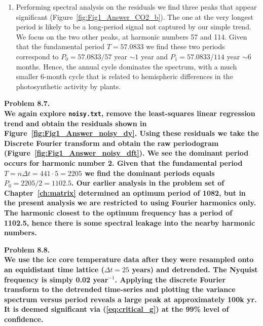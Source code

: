 \begin{enumerate}[label=\alph*)]
\item Performing spectral analysis on the residuals we find three peaks that appear significant
(Figure~\ref{fig:Fig1_Answer_CO2_b}).  The one at
the very longest period is likely to be a long-period signal not captured by our simple trend.  We focus on the two
other peaks, at harmonic numbers 57 and 114.  Given that the fundamental period $T = 57.0833$ we find these
two periods correspond to $P_0 = 57.0833/57$ year $\sim 1$ year and $P_1 = 57.0833/114$ year $\sim 6$ months.
Hence, the annual cycle dominates the spectrum, with a much smaller 6-month cycle that is related to hemispheric
differences in the photosynthetic activity by plants.
\end{enumerate}


\noindent
\bf{Problem 8.7.} \\

We again explore \texttt{noisy.txt}, remove the least-squares linear regression trend and obtain the residuals shown in Figure~\ref{fig:Fig1_Answer_noisy_dy}.
Using these residuals we take the Discrete Fourier transform and obtain the raw periodogram (Figure~\ref{fig:Fig1_Answer_noisy_dft}). We see the dominant period occurs for harmonic number 2.  Given that
the fundamental period $T = n\Delta t = 441 \cdot 5 = 2205$ we find the dominant
periods equals $P_0 = 2205/2 = 1102.5$.  Our earlier analysis in the problem set of Chapter~\ref{ch:matrix}
determined an optimum period of 1082, but in the
present analysis we are restricted to using Fourier harmonics only.  The harmonic closest to the optimum frequency
has a period of 1102.5, hence there is some spectral leakage into the nearby harmonic numbers.

\noindent
\bf{Problem 8.8.} \\

We use the ice core temperature data after they were resampled onto an equidistant time lattice ($\Delta t = 25$ years)
and detrended.  The Nyquist frequency is simply 0.02 year$^{-1}$. Applying the discrete Fourier transform
to the detrended time-series and plotting the variance spectrum versus period reveals a
large peak at approximately 100k yr.  It is deemed significant via (\ref{eq:critical_g}) at the 99\% level of confidence.


